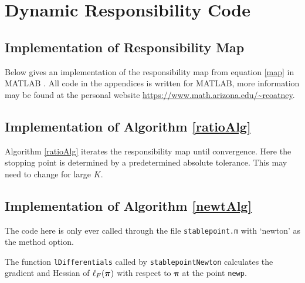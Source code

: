 \renewcommand{\thesubsection}{\Alph{subsection}}

\chapter{Dynamic Responsibility Code}\label{app:DRcode}
\section{Implementation of Responsibility Map}\label{code:map}
Below gives an implementation of the responsibility map from equation \eqref{map} in MATLAB \cite{MATLAB:2020a}. All code in the appendices is written for MATLAB, more information may be found at the personal website \url{https://www.math.arizona.edu/~rcoatney}.



\newpage
\section{Implementation of Algorithm \ref{ratioAlg}}\label{code:ratioAlg}
Algorithm \ref{ratioAlg} iterates the responsibility map until convergence.  Here the stopping point is determined by a predetermined absolute tolerance.  This may need to change for large $K$.


\newpage
\section{Implementation of Algorithm \ref{newtAlg}}\label{code:newtAlg}
The code here is only ever called through the file \verb|stablepoint.m| with `newton' as the method option. 


The function \verb|lDifferentials| called by \verb|stablepointNewton| calculates the gradient and Hessian of \( \ell_{F}({\bm\pi}) \) with respect to \( \bm\pi \) at the point \verb|newp|.

			
